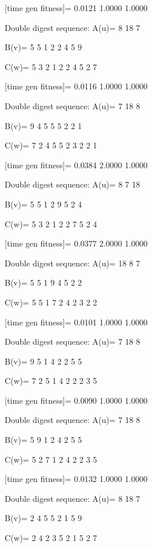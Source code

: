 [time gen fitness]=
    0.0121    1.0000    1.0000

Double digest sequence:
A(u)=
     8    18     7

B(v)=
     5     5     1     2     2     4     5     9

C(w)=
     5     3     2     1     2     2     4     5     2     7

[time gen fitness]=
    0.0116    1.0000    1.0000

Double digest sequence:
A(u)=
     7    18     8

B(v)=
     9     4     5     5     5     2     2     1

C(w)=
     7     2     4     5     5     2     3     2     2     1

[time gen fitness]=
    0.0384    2.0000    1.0000

Double digest sequence:
A(u)=
     8     7    18

B(v)=
     5     5     1     2     9     5     2     4

C(w)=
     5     3     2     1     2     2     7     5     2     4

[time gen fitness]=
    0.0377    2.0000    1.0000

Double digest sequence:
A(u)=
    18     8     7

B(v)=
     5     5     1     9     4     5     2     2

C(w)=
     5     5     1     7     2     4     2     3     2     2

[time gen fitness]=
    0.0101    1.0000    1.0000

Double digest sequence:
A(u)=
     7    18     8

B(v)=
     9     5     1     4     2     2     5     5

C(w)=
     7     2     5     1     4     2     2     2     3     5

[time gen fitness]=
    0.0090    1.0000    1.0000

Double digest sequence:
A(u)=
     7    18     8

B(v)=
     5     9     1     2     4     2     5     5

C(w)=
     5     2     7     1     2     4     2     2     3     5

[time gen fitness]=
    0.0132    1.0000    1.0000

Double digest sequence:
A(u)=
     8    18     7

B(v)=
     2     4     5     5     2     1     5     9

C(w)=
     2     4     2     3     5     2     1     5     2     7

